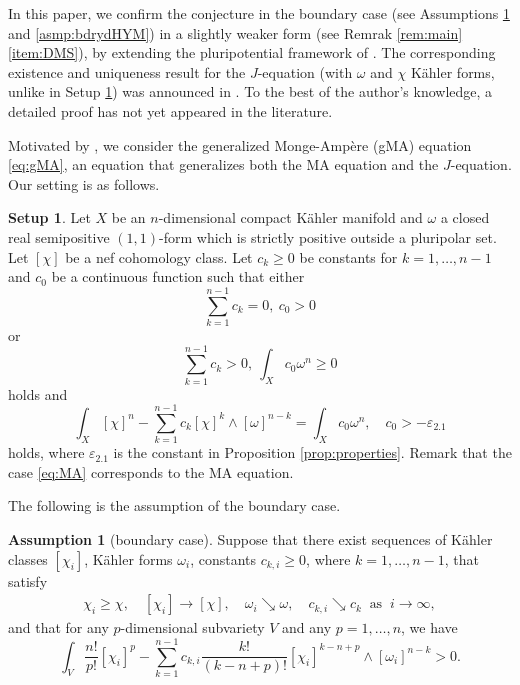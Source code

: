 \documentclass{amsart}
\numberwithin{equation}{section}
\theoremstyle{plain}
\theoremstyle{definition}
\newtheorem{setup}[equation]{Setup}
\newtheorem{asmp}[equation]{Assumption}
\theoremstyle{remark}
\begin{document}
In this paper, we confirm the conjecture in the boundary case (see Assumptions \ref{asmp:bdryMA} and \ref{asmp:bdrydHYM}) in a slightly weaker form (see Remrak \ref{rem:main} \ref{item:DMS}), by extending the pluripotential framework of \cite{BEGZ}. 
The corresponding existence and uniqueness result for the $J$-equation
(with $\omega$ and $\chi$ Kähler forms, unlike in Setup \ref{setup})
was announced in \cite{DMS}.
To the best of the author's knowledge, a detailed proof has not yet appeared in the literature.

Motivated by \cite{Datar-Pingali,FM}, we consider the generalized Monge-Ampère (gMA) equation \eqref{eq:gMA}, an equation that generalizes both the MA equation and the $J$-equation. Our setting is as follows. 
\begin{setup}\label{setup}
    Let $X$ be an $n$-dimensional compact Kähler manifold and $\omega$ a closed real semipositive $(1,1)$-form which is strictly positive outside a pluripolar set. Let $[\chi]$ be a nef cohomology class. Let $c_k\ge0$ be constants for $k=1,\dots,n-1$ and $c_0$ be a continuous function such that either 
    \begin{equation}\label{eq:MA}
        \sum_{k=1}^{n-1} c_k=0,\ c_0>0
    \end{equation} or 
    \begin{equation}\label{eq:gMAtop}
        \sum_{k=1}^{n-1} c_k>0,\ \int_Xc_0\omega^n\ge0
    \end{equation} 
    holds and
    \begin{equation*}
        \int_X[\chi]^n-\sum_{k=1}^{n-1}c_k[\chi]^{k}\wedge[\omega]^{n-k}=\int_Xc_0\omega^n,\quad c_0>-\varepsilon_{2.1}
    \end{equation*}
    holds, where $\varepsilon_{2.1}$ is the constant in Proposition \ref{prop:properties}. 
    Remark that the case \eqref{eq:MA} corresponds to the MA equation.
\end{setup}

The following is the assumption of the boundary case.

\begin{asmp}[boundary case]\label{asmp:bdryMA}
    Suppose that there exist sequences of Kähler classes $[\chi_i]$, Kähler forms $\omega_i$, constants $c_{k,i}\ge0$, where $k=1,\dots, n-1$, that satisfy 
        \begin{align}\label{eq:boundary}
            \chi_i\ge\chi , \quad [\chi_i]\to[\chi],\quad \omega_i\searrow \omega,\quad c_{k,i}\searrow c_k\ \text{ as }\ i\to\infty,
        \end{align}
    and that for any $p$-dimensional subvariety $V$ and any $p=1,\dots, n$, we have
        \begin{equation}\label{eq:gMAposi}
            \int_V\frac{n!}{p!}[\chi_i]^p-\sum_{k=1}^{n-1}c_{k,i}\frac{k!}{(k-n+p)!}[\chi_i]^{k-n+p}\wedge[\omega_i]^{n-k}>0.
        \end{equation}
\end{asmp}
\end{document}
